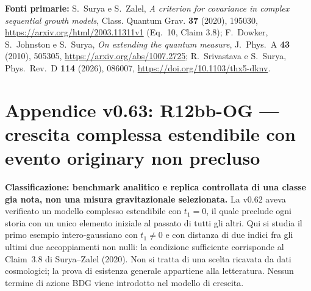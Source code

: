 \documentclass[11pt,a4paper]{article}
\begin{document}
\medskip
\textbf{Fonti primarie:} S.~Surya e S.~Zalel, \emph{A criterion for covariance in complex sequential growth models}, Class. Quantum Grav. \textbf{37} (2020), 195030, \url{https://arxiv.org/html/2003.11311v1} (Eq.~10, Claim 3.8); F.~Dowker, S.~Johnston e S.~Surya, \emph{On extending the quantum measure}, J.~Phys.~A \textbf{43} (2010), 505305, \url{https://arxiv.org/abs/1007.2725}; R.~Srivastava e S.~Surya, Phys.~Rev.~D \textbf{114} (2026), 086007, \url{https://doi.org/10.1103/thx5-dknv}.




\clearpage
\section*{Appendice v0.63: R12bb-OG --- crescita complessa estendibile con evento originary non precluso}
\label{sec:r12bbog}
\textbf{Classificazione: benchmark analitico e replica controllata di una classe gia nota, non una misura gravitazionale selezionata.}
La v0.62 aveva verificato un modello complesso estendibile con $t_1=0$, il quale preclude ogni storia con un unico elemento iniziale al passato di tutti gli altri. Qui si studia il primo esempio intero-gaussiano con $t_1\ne0$ e con distanza di due indici fra gli ultimi due accoppiamenti non nulli: la condizione sufficiente corrisponde al Claim~3.8 di Surya--Zalel (2020). Non si tratta di una scelta ricavata da dati cosmologici; la prova di esistenza generale appartiene alla letteratura. Nessun termine di azione BDG viene introdotto nel modello di crescita.
\end{document}
